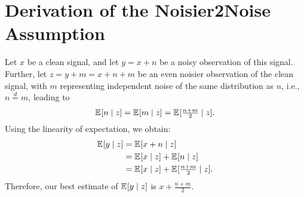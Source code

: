 \section{Derivation of the Noisier2Noise Assumption}

Let $x$ be a clean signal, and let $y = x + n$ be a noisy observation of this signal.
Further, let $z = y + m = x + n + m$ be an even noisier observation of the clean signal, with $m$ representing independent noise of the same distribution as $n$, i.e., $n\overset{d}{=}m$, leading to
\begin{equation}
    \mathbb{E}_{ } [n \mid z] = \mathbb{E}_{ } [m \mid z] = \mathbb{E}_{ } [\tfrac{n+m}{2} \mid z].
\end{equation}
Using the linearity of expectation, we obtain:
\begin{equation}
\begin{split}
    \mathbb{E}_{ } [y \mid z] &= \mathbb{E}_{ } [x+n \mid z]\\
    &= \mathbb{E}_{ } [x \mid z] + \mathbb{E}_{ } [n \mid z]\\
    &= \mathbb{E}_{ } [x\mid z] + \mathbb{E}_{ } [\tfrac{n+m}{2} \mid z].
\end{split}
\end{equation}
Therefore, our best estimate of $\mathbb{E}_{ } [y \mid z]$ is $x + \frac{n + m}{2}$.
